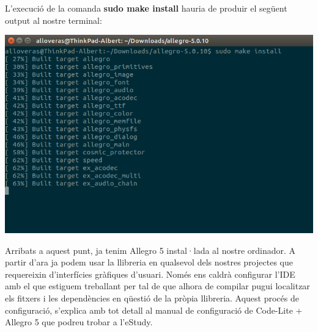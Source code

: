 \documentclass[11pt]{article}
\begin{document}
\noindent L'execució de la comanda \textbf{sudo make install} hauria de produir el següent output al nostre terminal:

\begin{center}
	\includegraphics[scale=0.4]{img/Make_Install_Process.png}
\end{center}

\noindent Arribats a aquest punt, ja tenim Allegro 5 instal·lada al nostre ordinador. A partir d'ara ja podem usar la llibreria en qualsevol dels nostres projectes que requereixin d'interfícies gràfiques d'usuari. Només ens caldrà configurar l'IDE amb el que estiguem treballant per tal de que alhora de compilar pugui localitzar els fitxers i les dependències en qüestió de la pròpia llibreria. Aquest procés de configuració, s'explica amb tot detall al manual de configuració de Code-Lite + Allegro 5 que podreu trobar a l'eStudy.
\end{document}

